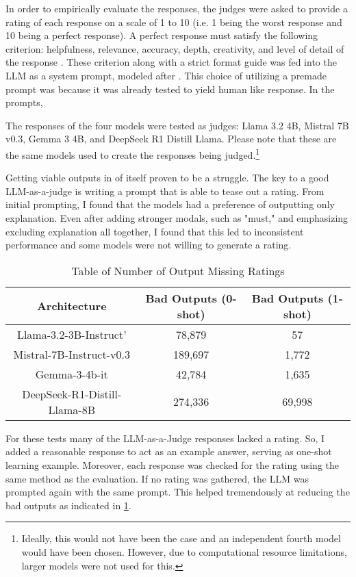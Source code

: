 \documentclass{brandeis-thesis3.2}
\theoremstyle{plain}
\theoremstyle{definition}
\theoremstyle{remark}
\numberwithin{equation}{section}
\renewcommand\cite{\citep}
\begin{document}
In order to empirically evaluate the responses, the judges were asked to provide a rating of each response on a scale of 1 to 10 (i.e. 1 being the worst response and 10 being a perfect response). A perfect response must satisfy the following criterion: helpfulness, relevance, accuracy, depth, creativity, and level of detail of the response \cite{zheng_judging_2023}. These criterion along with a strict format guide was fed into the LLM as a system prompt, modeled after \citealt{zheng_judging_2023}. This choice of utilizing a premade prompt was because it was already tested to yield human like response. In the prompts, 

The responses of the four models were tested as judges: Llama 3.2 4B, Mistral 7B v0.3, Gemma 3 4B, and DeepSeek R1 Distill Llama. Please note that these are the same models used to create the responses being judged.\footnote{Ideally, this would not have been the case and an independent fourth model would have been chosen. However, due to computational resource limitations, larger models were not used for this.} 

Getting viable outputs in of itself proven to be a struggle. The key to a good LLM-as-a-judge is writing a prompt that is able to tease out a rating. From initial prompting, I found that the models had a preference of outputting only explanation. Even after adding stronger modals, such as "must," and emphasizing excluding explanation all together, I found that this led to inconsistent performance and some models were not willing to generate a rating. 
\begin{table}
    \centering
    \begin{tabular}{|c|c|c|}
        \hline
        Architecture  & Bad Outputs (0-shot) & Bad Outputs (1-shot)\\
        \hline
        Llama-3.2-3B-Instruct' & 78,879& 57\\
        Mistral-7B-Instruct-v0.3 & 189,697& 1,772\\
        Gemma-3-4b-it & 42,784& 1,635\\
        DeepSeek-R1-Distill-Llama-8B & 274,336& 69,998\\
        \hline
    \end{tabular}
    \caption{Table of Number of Output Missing Ratings}
    \label{tab:bad_output}
\end{table}
For these tests many of the LLM-as-a-Judge responses lacked a rating. So, I added a reasonable response to act as an example answer, serving as one-shot learning example. Moreover, each response was checked for the rating using the same method as the evaluation. If no rating was gathered, the LLM was prompted again with the same prompt. This helped tremendously at reducing the bad outputs as indicated in \ref{tab:bad_output}. 
\end{document}
